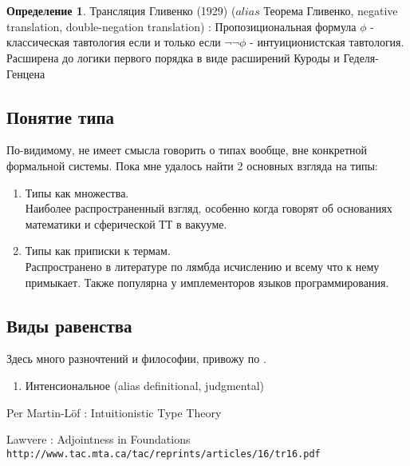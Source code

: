 \documentclass[10pt,a4paper]{article}
\theoremstyle{definition}
\newtheorem{Def}{Определение}
\begin{document}
\\
\\
\begin{Def}
Трансляция Гливенко (1929) ($alias$ Теорема Гливенко, negative translation, double-negation translation) :  Пропозициональная формула $\phi$ - классическая тавтология если и только если $\neg \neg \phi$ - интуиционистская тавтология. Расширена до логики первого порядка в виде расширений Куроды и Геделя-Генцена\\
\end{Def}

\subsection{Понятие типа}
По-видимому, не имеет смысла говорить о типах вообще, вне конкретной формальной системы. Пока мне удалось найти 2 основных взгляда на типы:
\begin{enumerate}
\item Типы как множества. \\
  Наиболее распространенный взгляд, особенно когда говорят об основаниях математики и сферической ТТ в вакууме.
\item Типы как приписки к термам. \\
  Распространено в литературе по лямбда исчислению и всему что к нему примыкает. Также популярна у имплементоров языков программирования.
\end{enumerate}

\subsection{Виды равенства}

Здесь много разночтений и философии, привожу по \cite{PML1980}.


\begin{enumerate}
\item Интенсиональное (alias definitional, judgmental)\\

\end{enumerate}

\newpage


\begin{thebibliography}{9}

Per Martin-Löf : Intuitionistic Type Theory

Lawvere : Adjointness in Foundations
\\\texttt{http://www.tac.mta.ca/tac/reprints/articles/16/tr16.pdf}

\end{thebibliography}
 
\end{document}

